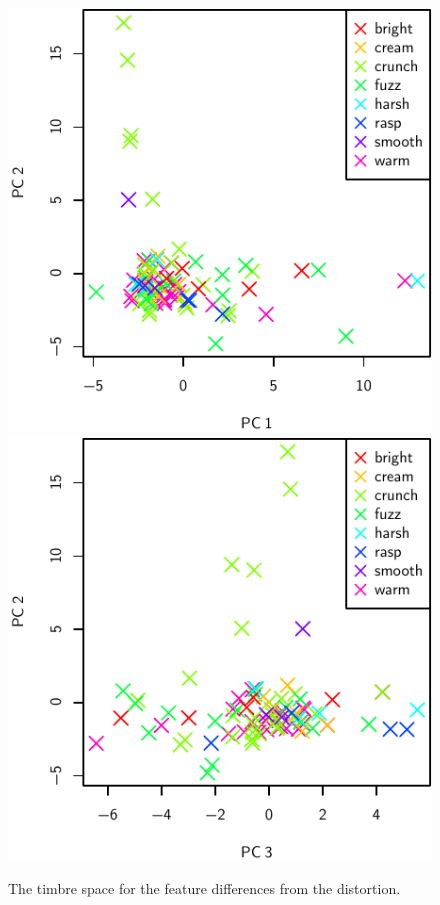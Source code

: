 			\begin{figure}[h!]
				\centering
				\subfloat
				{
					\includegraphics{chapter4/Images/DistortionDifferencePCA1-2.pdf}
					\label{fig:DistortionDifferencePCA1-2}
				}
				\quad
				\subfloat
				{
					\includegraphics{chapter4/Images/DistortionDifferencePCA3-2.pdf}
					\label{fig:DistortionDifferencePCA3-2}
				}
				\caption{The timbre space for the feature differences from the distortion.}
				\label{fig:DistortionDifferencePCAs}
			\end{figure}

